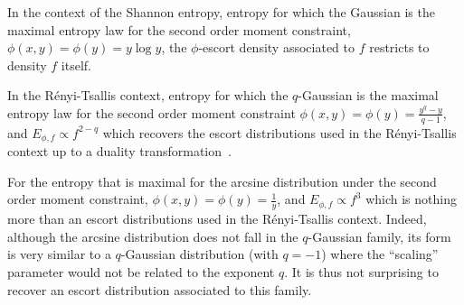 \documentclass[entropy,article,submit,moreauthors,pdftex]{Definitions/mdpi}
\newcounter{GaussExample}%
\newcounter{qGaussExample}%
\newcounter{arcsineExample}%
\newcommand{\SZ}[1]{{\color{blue} #1}}                                       %
\begin{document}
\renewcommand{\theexample}{\arabic{example}}
\begin{Example}
  In the context of  the Shannon entropy, entropy for which  the Gaussian is the
  maximal  entropy law  for the  second  order moment  constraint, $\phi(x,y)  =
  \phi(y) = y \log y$, the  $\phi$-escort density associated to $f$ restricts to
  density $f$ itself.
\end{Example}
%
\begin{Example}
  In  the R\'enyi-Tsallis  context, entropy  for which  the $q$-Gaussian  is the
  maximal  entropy law  for  the  second order  moment  constraint $\phi(x,y)  =
  \phi(y) = \frac{y^q-y}{q-1}$, and  $E_{\phi,f} \propto f^{2-q}$ which recovers
  the escort distributions  used in the R\'enyi-Tsallis context up  to a duality
  transformation~\cite{Nau11}.
\end{Example}
%
\begin{Example}
  For the entropy that is maximal  for the arcsine distribution under the second
  order moment constraint, $\phi(x,y) =  \phi(y) = \frac{1}{y}$, and $E_{\phi,f}
  \propto f^3$  which is nothing more  than an escort distributions  used in the
  R\'enyi-Tsallis context.   Indeed, although the arcsine  distribution does not
  fall  in   the  $q$-Gaussian   family,  its   form  is   very  similar   to  a
  \SZ{$q$-Gaussian}  distribution \SZ{(with  $q  = -1$)}  where the  ``scaling''
  parameter would not be related to the exponent $q$.  It is thus not surprising
  to recover an escort distribution associated to this family.
\end{Example}
\end{document}
